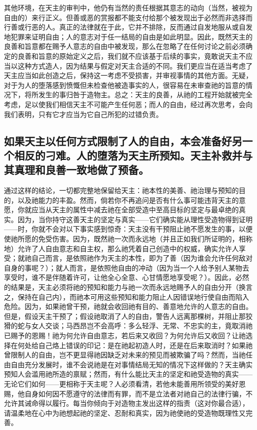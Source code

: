 其他环境，在天主的审判中，他仍有当然的责任根据其意志的动向（当然，被视为自由的）来行正义。但善或恶的赏报都不能支付给那个被发现出于必然而非选择而行善或行恶的人。真正的法律就在于此，它并不排除，反而通过自发地服从或自发地犯罪来证明自由；人的意志对于任一结局的自由是如此明显。因此，既然天主的良善和旨意都在赐予人意志的自由中被发现，那么在忽略了在任何讨论之前必须确定的良善和旨意的原始定义之后，我们就不应该基于后续的事实，竟敢说天主不应当以这种方式造人，因为结果与假定对天主合适的不同。我们更应当在适当考虑了天主应当如此创造之后，保持这一考虑不受损害，并审视事情的其他方面。无疑，对于为人的堕落感到愤慨但未检查他被造事实的人，很容易在未审查祂的旨意的情况下，将所发生的事归咎于造物主。总之：天主的良善，从祂的工程开始就被完全考虑，足以使我们相信天主不可能产生任何恶；而人的自由，经过再次思考，会向我们表明，只有它才应当为它自己所犯的过错负责。\par


\subsection{如果天主以任何方式限制了人的自由，本会准备好另一个相反的刁难。人的堕落为天主所预知。天主补救并与其真理和良善一致地做了预备。}

通过这样的结论，一切都完整地保留给天主：祂本性的美善、祂治理与预知的目的，以及祂能力的丰盈。然而，倘若你不再追问是否有什么事可能违背天主的意愿，你就应当从天主的属性中减去祂在全部受造中至高目标的坚定与最卓绝的真实。因为，当你持守这善天主的坚定与真实——它们确实能从理性受造物得到证明——时，你就不会对以下事实感到惊奇：天主没有干预阻止祂不愿发生的事，以便使祂所愿的免受伤害。因为，既然祂一次而永远地（并且正如我们所证明的，相称地）允许了人自由意志和自主权，那么祂凭着自己创造中的权威，确实允许人享受；就祂自己而言，是依照祂作为天主的本性，即为了善（因为谁会允许任何敌对自身的事呢？）；就人而言，是依照他自由的冲动（因为当一个人给予别人某物去享受时，谁不是伴随着许可，让他全心全意、心甘情愿地享受呢？）。因此，必然的结果是，天主必须将祂的预知和能力与祂一次而永远地赐予人的自由分开（换言之，保持在自己内），而祂本可用这些预知和能力阻止人因错误地行使自由而陷入危险。因为，如果祂曾干预，祂就会收回祂有目的、善意地允许的人意志的自由。但是，假设天主干预了；假设祂取消了人的自由，警告人远离那棵树，并阻止那狡猾的蛇与女人交谈；马西昂岂不会高呼：多么轻浮、无常、不忠实的主，竟取消祂已赐予的恩赐！祂为何允许自由意志，若后来又收回？为何允许后又收回？让祂选择在何处给自己烙上错误的印记：是在祂起初造人时，还是在后来取消时？如果祂曾限制人的自由，岂不更显得祂因缺乏对未来的预见而被欺骗了吗？然而，当祂任由自由充分发展时，谁不会说祂是在对事情结局无知的情况下这样做的？天主确实预知人会滥用祂所造的禀赋；然而，有什么能比天主的坚定和祂受造物的真实——无论它们如何——更相称于天主呢？人必须看清，若他未能善用所领受的美好恩赐，他自身如何因不愿遵守的法律而有罪，而不是立法者对祂自己的法律行骗，不允许其诫命得以履行。每当你倾向于对造物主发出这样的指责（这对你最合适），请温柔地在心中为祂想起祂的坚定、忍耐和真实，因为祂使祂的受造物既理性又完善。\par

